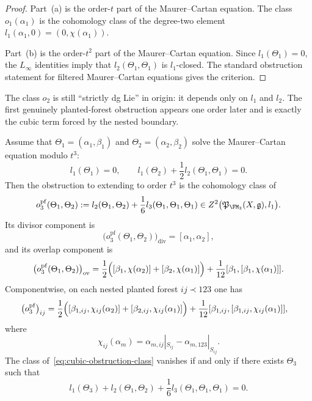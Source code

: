 \begin{proof}
Part~(a) is the order-$t$ part of the Maurer--Cartan equation.  The class
$o_1(\alpha_1)$ is the cohomology class of the degree-two element
$l_1(\alpha_1,0)=(0,\chi(\alpha_1))$.

Part~(b) is the order-$t^2$ part of the Maurer--Cartan equation.  Since
$l_1(\Theta_1)=0$, the $L_\infty$ identities imply that
$l_2(\Theta_1,\Theta_1)$ is $l_1$-closed.  The standard obstruction statement
for filtered Maurer--Cartan equations gives the criterion.
\end{proof}

The class $o_2$ is still ``strictly dg Lie'' in origin: it depends only on $l_1$
and $l_2$.  The first genuinely planted-forest obstruction appears one order
later and is exactly the cubic term forced by the nested boundary.

\begin{theorem}
\label{thm:fm3-cubic-obstruction}
Assume that $\Theta_1=(\alpha_1,\beta_1)$ and $\Theta_2=(\alpha_2,\beta_2)$
solve the Maurer--Cartan equation modulo $t^3$:
\[
 l_1(\Theta_1)=0,
 \qquad
 l_1(\Theta_2)+\frac12 l_2(\Theta_1,\Theta_1)=0.
\]
Then the obstruction to extending to order $t^3$ is the cohomology class of
\begin{equation}
\label{eq:cubic-obstruction-class}
 o^{\mathrm{pf}}_3(\Theta_1,\Theta_2)
 :=
 l_2(\Theta_1,\Theta_2) + \frac16 l_3(\Theta_1,\Theta_1,\Theta_1)
 \in
 Z^2\bigl(\mathfrak P_{\FM_3}(X,\mathfrak g),l_1\bigr).
\end{equation}
Its divisor component is
\begin{equation}
\label{eq:cubic-obstruction-divisor}
\bigl(o^{\mathrm{pf}}_3(\Theta_1,\Theta_2)\bigr)_{\mathrm{div}}
=
[\alpha_1,\alpha_2],
\end{equation}
and its overlap component is
\begin{equation}
\label{eq:cubic-obstruction-overlap}
\bigl(o^{\mathrm{pf}}_3(\Theta_1,\Theta_2)\bigr)_{\mathrm{ov}}
=
\frac12\Bigl([\beta_1,\chi(\alpha_2)] + [\beta_2,\chi(\alpha_1)]\Bigr)
+ \frac1{12}[\beta_1,[\beta_1,\chi(\alpha_1)]].
\end{equation}
Componentwise, on each nested planted forest $ij\prec 123$ one has
\begin{align}
\label{eq:cubic-obstruction-componentwise}
\bigl(o^{\mathrm{pf}}_3\bigr)_{ij}
&=
\frac12\Bigl([
\beta_{1,ij},\chi_{ij}(\alpha_2)] + [\beta_{2,ij},\chi_{ij}(\alpha_1)]\Bigr)
+ \frac1{12}[\beta_{1,ij},[\beta_{1,ij},\chi_{ij}(\alpha_1)]],
\end{align}
where
\[
\chi_{ij}(\alpha_m)
=
\alpha_{m,ij}|_{S_{ij}} - \alpha_{m,123}|_{S_{ij}}.
\]
The class of~\eqref{eq:cubic-obstruction-class} vanishes if and only if there
exists $\Theta_3$ such that
\[
 l_1(\Theta_3) + l_2(\Theta_1,\Theta_2) + \frac16 l_3(\Theta_1,\Theta_1,\Theta_1)=0.
\]
\end{theorem}

